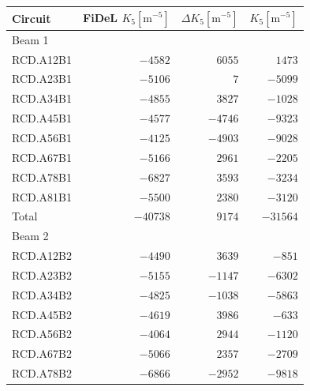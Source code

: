 \begin{table}[!htb]
    \centering
    \begin{tabular}{lrrr}
    \toprule
    Circuit & FiDeL $K_5 [\textrm{m}^{-5}]$ & $\Delta K_5 [\textrm{m}^{-5}]$ & $K_5 [\textrm{m}^{-5}]$\\
    \midrule
    Beam 1 & \\
    \hspace{2mm}RCD.A12B1 &$-4582$ & $6055 $ &  $ 1473 $\\
    \hspace{2mm}RCD.A23B1 &$-5106$ & $7    $ &  $-5099 $\\
    \hspace{2mm}RCD.A34B1 &$-4855$ & $3827 $ &  $-1028 $\\
    \hspace{2mm}RCD.A45B1 &$-4577$ & $-4746$ &  $-9323 $\\
    \hspace{2mm}RCD.A56B1 &$-4125$ & $-4903$ &  $-9028 $\\
    \hspace{2mm}RCD.A67B1 &$-5166$ & $2961 $ &  $-2205 $\\
    \hspace{2mm}RCD.A78B1 &$-6827$ & $3593 $ &  $-3234 $\\
    \hspace{2mm}RCD.A81B1 &$-5500$ & $2380 $ &  $-3120 $\\
    \hspace{2mm}Total     &$-40738$& $9174 $ &  $-31564$\\
    Beam 2 & \\  %
    \hspace{2mm}RCD.A12B2 &$-4490$ & $3639 $ &  $-851  $\\
    \hspace{2mm}RCD.A23B2 &$-5155$ & $-1147$ &  $-6302 $\\
    \hspace{2mm}RCD.A34B2 &$-4825$ & $-1038$ &  $-5863 $\\
    \hspace{2mm}RCD.A45B2 &$-4619$ & $3986 $ &  $-633  $\\
    \hspace{2mm}RCD.A56B2 &$-4064$ & $2944 $ &  $-1120 $\\
    \hspace{2mm}RCD.A67B2 &$-5066$ & $2357 $ &  $-2709 $\\
    \hspace{2mm}RCD.A78B2 &$-6866$ & $-2952$ &  $-9818 $\\

\end{tabular}
\end{table}
